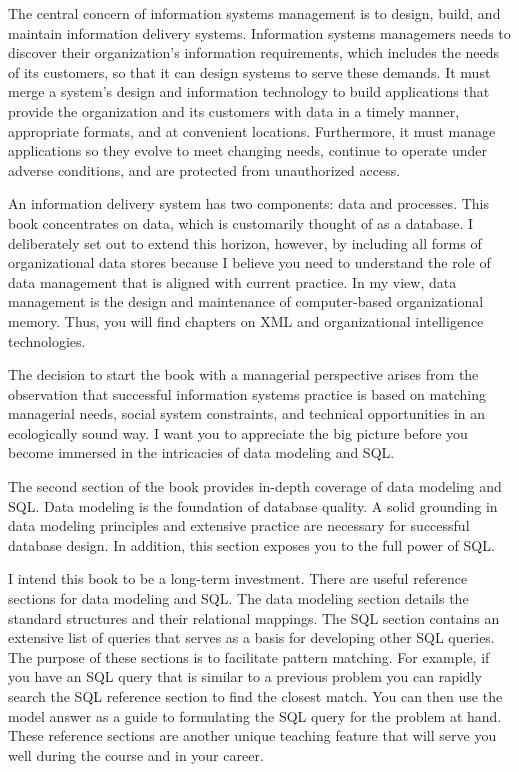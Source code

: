 \documentclass[
]{article}
\begin{document}
The central concern of information systems management is to design,
build, and maintain information delivery systems. Information systems
managemers needs to discover their organization's information
requirements, which includes the needs of its customers, so that it can
design systems to serve these demands. It must merge a system's design
and information technology to build applications that provide the
organization and its customers with data in a timely manner, appropriate
formats, and at convenient locations. Furthermore, it must manage
applications so they evolve to meet changing needs, continue to operate
under adverse conditions, and are protected from unauthorized access.

An information delivery system has two components: data and processes.
This book concentrates on data, which is customarily thought of as a
database. I deliberately set out to extend this horizon, however, by
including all forms of organizational data stores because I believe you
need to understand the role of data management that is aligned with
current practice. In my view, data management is the design and
maintenance of computer-based organizational memory. Thus, you will find
chapters on XML and organizational intelligence technologies.

The decision to start the book with a managerial perspective arises from
the observation that successful information systems practice is based on
matching managerial needs, social system constraints, and technical
opportunities in an ecologically sound way. I want you to appreciate the
big picture before you become immersed in the intricacies of data
modeling and SQL.

The second section of the book provides in-depth coverage of data
modeling and SQL. Data modeling is the foundation of database quality. A
solid grounding in data modeling principles and extensive practice are
necessary for successful database design. In addition, this section
exposes you to the full power of SQL.

I intend this book to be a long-term investment. There are useful
reference sections for data modeling and SQL. The data modeling section
details the standard structures and their relational mappings. The SQL
section contains an extensive list of queries that serves as a basis for
developing other SQL queries. The purpose of these sections is to
facilitate pattern matching. For example, if you have an SQL query that
is similar to a previous problem you can rapidly search the SQL
reference section to find the closest match. You can then use the model
answer as a guide to formulating the SQL query for the problem at hand.
These reference sections are another unique teaching feature that will
serve you well during the course and in your career.
\end{document}
